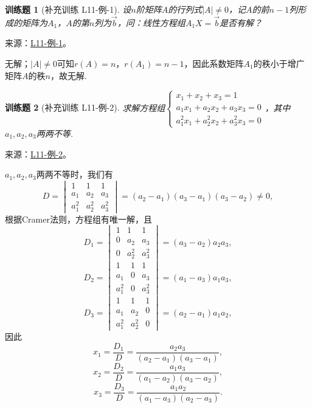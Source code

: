 \documentclass[12pt,fontset=fandol]{ctexart}
\newtheorem{exercise}{训练题}[section]
\begin{document}
\begin{exercise}[补充训练 L11-例-1]\label{prob:L11-例-1}
设$n$阶矩阵$A$的行列式$|A|\neq 0$，记$A$的前$n-1$列形成的矩阵为$A_1$，$A$的第$n$列为$\vec{b}$，问：线性方程组$A_1X=\vec{b}$是否有解？
\end{exercise}
\noindent 来源：\href{https://github.com/yhwu-is/Linear-Algebra-Left-Undone/blob/new/%E8%AE%B2%E4%B9%89/%E4%B8%93%E9%A2%98/11%20%E6%9C%9D%E8%8A%B1%E5%A4%95%E6%8B%BE.tex}{L11-例-1}。
\begin{solve}
无解；$|A|\neq 0$可知$r(A)=n$，$r(A_1)=n-1$，因此系数矩阵$A_1$的秩小于增广矩阵$A$的秩$n$，故无解.
\end{solve}

\begin{exercise}[补充训练 L11-例-2]\label{prob:L11-例-2}
求解方程组$\begin{cases}
            x_1+x_2+x_3=1          \\
            a_1x_1+a_2x_2+a_3x_3=0 \\
            a_1^2x_1+a_2^2x_2+a_3^2x_3=0
        \end{cases}$，其中$a_1,a_2,a_3$两两不等.
\end{exercise}
\noindent 来源：\href{https://github.com/yhwu-is/Linear-Algebra-Left-Undone/blob/new/%E8%AE%B2%E4%B9%89/%E4%B8%93%E9%A2%98/11%20%E6%9C%9D%E8%8A%B1%E5%A4%95%E6%8B%BE.tex}{L11-例-2}。
\begin{solve}
$a_1,a_2,a_3$两两不等时，我们有
    \[D=\begin{vmatrix}
            1     & 1     & 1     \\
            a_1   & a_2   & a_3   \\
            a_1^2 & a_2^2 & a_3^2
        \end{vmatrix}=(a_2-a_1)(a_3-a_1)(a_3-a_2)\neq 0,\]
    根据Cramer法则，方程组有唯一解，且
    \[D_1=\begin{vmatrix}
            1 & 1     & 1     \\
            0 & a_2   & a_3   \\
            0 & a_2^2 & a_3^2
        \end{vmatrix}=(a_3-a_2)a_2a_3,\]
    \[D_2=\begin{vmatrix}
            1     & 1 & 1     \\
            a_1   & 0 & a_3   \\
            a_1^2 & 0 & a_3^2
        \end{vmatrix}=(a_1-a_3)a_1a_3,\]
    \[D_3=\begin{vmatrix}
            1     & 1     & 1 \\
            a_1   & a_2   & 0 \\
            a_1^2 & a_2^2 & 0
        \end{vmatrix}=(a_2-a_1)a_1a_2,\]
    因此
    \[x_1=\dfrac{D_1}{D}=\dfrac{a_2a_3}{(a_2-a_1)(a_3-a_1)},\]\[x_2=\dfrac{D_2}{D}=\dfrac{a_1a_3}{(a_1-a_2)(a_3-a_2)},\]\[x_3=\dfrac{D_3}{D}=\dfrac{a_1a_2}{(a_1-a_3)(a_2-a_3)}.\]
\end{solve}
\end{document}
